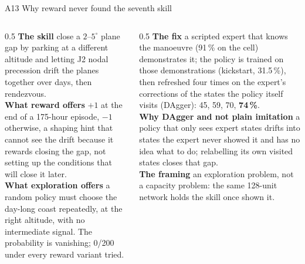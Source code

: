 \documentclass[aspectratio=169,11pt]{beamer}
\newcommand{\key}[1]{\textcolor{accent}{\textbf{#1}}}
\begin{document}
\begin{frame}{A13 \; Why reward never found the seventh skill}
\begin{columns}[T]
\begin{column}{0.5\textwidth}\small
\textbf{The skill} \; close a $2$--$5^\circ$ plane gap by parking at a different altitude and letting J2 nodal precession drift the planes together over days, then rendezvous.\\[2mm]
\textbf{What reward offers} \; $+1$ at the end of a 175-hour episode, $-1$ otherwise, a shaping hint that cannot see the drift because it rewards closing the gap, not setting up the conditions that will close it later.\\[2mm]
\textbf{What exploration offers} \; a random policy must choose the day-long coast repeatedly, at the right altitude, with no intermediate signal. The probability is vanishing; 0/200 under every reward variant tried.
\end{column}
\begin{column}{0.5\textwidth}\small
\textbf{The fix} \; a scripted expert that knows the manoeuvre (91\,\% on the cell) demonstrates it; the policy is trained on those demonstrations (kickstart, 31.5\,\%), then refreshed four times on the expert's corrections of the states the policy itself visits (DAgger): 45, 59, 70, \key{74\,\%}.\\[2mm]
\textbf{Why DAgger and not plain imitation} \; a policy that only sees expert states drifts into states the expert never showed it and has no idea what to do; relabelling its own visited states closes that gap.\\[2mm]
\textbf{The framing} \; an exploration problem, not a capacity problem: the same 128-unit network holds the skill once shown it.
\end{column}
\end{columns}
\end{frame}
\end{document}

